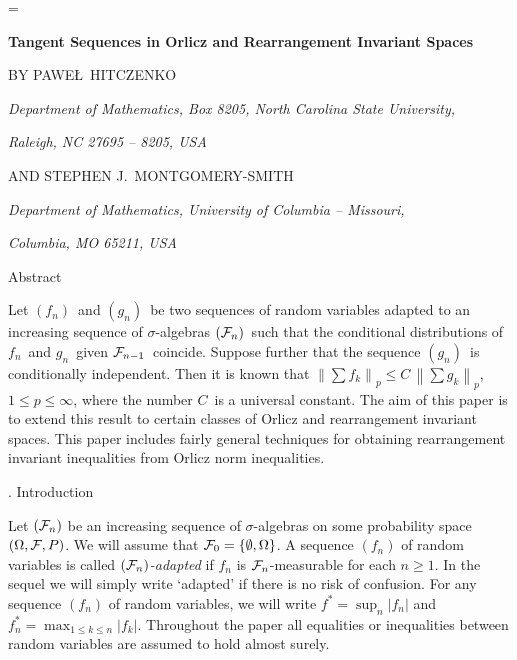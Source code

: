 \magnification=

\def\e{\epsilon}
\def\d{\delta}
\def\x{\xi}
\def\t{\tau}
\def\k{\kappa}
\def\im{\item}
\def\ss{\smallskip}
\def\ov{\overline}
\def\Ph{\Phi_{\delta}}
\def\moreproclaim{\par}

\def\modo#1{\left|#1\right|}
\def\normo#1{\left\|#1\right\|}

\def\Bbb{\bf}
\def\E{\Bbb E}

\centerline{\bf Tangent Sequences in Orlicz and Rearrangement Invariant
Spaces}

\bigskip

\centerline{BY PAWE\L\  HITCZENKO}

\medskip
\centerline{\it Department of Mathematics, Box 8205, North Carolina 
State University,}
\centerline{\it Raleigh, NC 27695 -- 8205, USA}

\bigskip
\centerline {AND STEPHEN J.~MONTGOMERY-SMITH}

\medskip
\centerline{\it Department of Mathematics,  University of Columbia -- 
Missouri,}
\centerline{\it Columbia, MO 65211, USA}

 

\beginsection Abstract

Let $(f_n)$\ and $(g_n)$\ be two sequences of random variables adapted 
to an increasing sequence of $\sigma$-algebras $({\cal F}_n)$\ such that
the conditional distributions of $f_n$\ and $g_n$\ given ${\cal
F}_{n-1}$\ coincide.  Suppose further that the sequence $(g_n)$\ is
conditionally independent. Then it is known that  $\normo{\sum f_k}_p
\le C \, \normo{\sum g_k}_p$, $1 \le p \le
\infty$, where the number $C$\ is a universal constant.
The aim of this paper is to extend this result to
certain classes of Orlicz and rearrangement invariant spaces. This paper
includes fairly general techniques for obtaining rearrangement invariant
inequalities from Orlicz norm inequalities.


. Introduction

Let $({\cal F}_n)$ be an increasing sequence of $\sigma$-algebras on some
probability space $(\Omega ,{\cal F},P)$. We will assume that ${\cal
F}_0=\{\emptyset ,\Omega\}$. A sequence $(f_n)$ of random variables is
called {\it $({\cal F}_n)$-adapted\/}
if $f_n$ is ${\cal F}_n$-measurable for each $n \ge 1$. In the sequel we
will simply write `adapted' if there is no risk of confusion. For any 
sequence $(f_n)$ of random variables, we will write $f^*=\sup_n|f_n|$ and
$f_n^*=\max_{1\leq k\leq n}|f_k|$. Throughout the paper all equalities
or inequalities between random variables are assumed to hold almost
surely.

